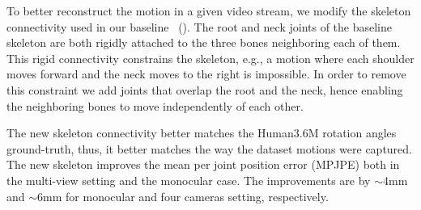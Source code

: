  \label{sec:skeleton}



To better reconstruct the motion in a given video stream, we modify the skeleton connectivity used in our baseline~\cite{shi2020motionet} ().
The root and neck joints of the baseline skeleton are both rigidly attached to the three bones neighboring each of them.
This rigid connectivity constrains the skeleton, e.g., a motion where each shoulder moves forward and the neck moves to the right is impossible.
In order to remove this constraint we add joints that overlap the root and the neck, hence enabling the neighboring bones to move independently of each other. 

The new skeleton connectivity better matches the Human3.6M rotation angles ground-truth, thus, it better matches the way the dataset motions were captured.
The new skeleton improves the mean per joint position error (MPJPE) both in the multi-view setting and the monocular case. The improvements are by  $\sim$4mm and $\sim$6mm for monocular and four cameras setting, respectively.


